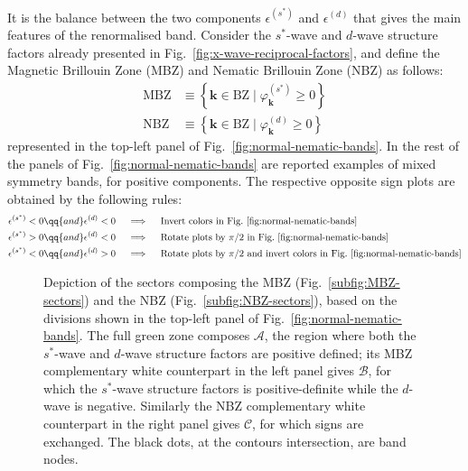 It is the balance between the two components $\epsilon^{(s^*)}$ and $\epsilon^{(d)}$ that gives the main features of the renormalised band. Consider the $s^*$-wave and $d$-wave structure factors already presented in Fig.~\ref{fig:x-wave-reciprocal-factors}, and define the Magnetic Brillouin Zone (MBZ) and Nematic Brillouin Zone (NBZ) as follows:
\begin{align}
	\mathrm{MBZ} &\equiv \left\lbrace
	\mathbf{k}\in\mathrm{BZ}
	\mid 
	\varphi_\mathbf{k}^{(s^*)} \ge 0
	\right\rbrace \label{eq:MBZ-def} \\
	\mathrm{NBZ} &\equiv \left\lbrace
	\mathbf{k}\in\mathrm{BZ}
	\mid 
	\varphi_\mathbf{k}^{(d)} \ge 0
	\right\rbrace \label{eq:NBZ-def}
\end{align}
represented in the top-left panel of Fig.~\ref{fig:normal-nematic-bands}. In the rest of the panels of Fig.~\ref{fig:normal-nematic-bands} are reported examples of mixed symmetry bands, for positive components. The respective opposite sign plots are obtained by the following rules:
\[
\begin{aligned}
	\epsilon^{(s^*)} < 0 \qq{and} \epsilon^{(d)} < 0
	\quad&\implies\quad \text{Invert colors in Fig.~\ref{fig:normal-nematic-bands}} \\
	\epsilon^{(s^*)} > 0 \qq{and} \epsilon^{(d)} < 0
	\quad&\implies\quad \text{Rotate plots by $\pi/2$ in Fig.~\ref{fig:normal-nematic-bands}} \\
	\epsilon^{(s^*)} < 0 \qq{and} \epsilon^{(d)} > 0
	\quad&\implies\quad \text{Rotate plots by $\pi/2$ and invert colors in Fig.~\ref{fig:normal-nematic-bands}} \\
\end{aligned}
\]

\begin{figure}
	\centering
	\caption{Depiction of the sectors composing the MBZ (Fig.~\ref{subfig:MBZ-sectors}) and the NBZ (Fig.~\ref{subfig:NBZ-sectors}), based on the divisions shown in the top-left panel of Fig.~\ref{fig:normal-nematic-bands}. The full green zone composes $\mathcal{A}$, the region where both the $s^*$-wave and $d$-wave structure factors are positive defined; its MBZ complementary white counterpart in the left panel gives $\mathcal{B}$, for which the $s^*$-wave structure factors is positive-definite while the $d$-wave is negative. Similarly the NBZ complementary white counterpart in the right panel gives $\mathcal{C}$, for which signs are exchanged. The black dots, at the contours intersection, are band nodes.}
	\label{fig:BZ-sectors}
\end{figure}


